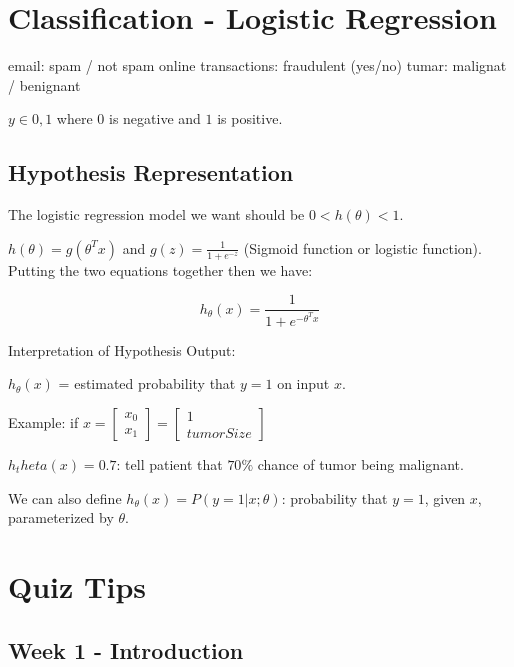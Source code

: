 \documentclass[a4paper]{article}
\begin{document}
\section{Classification - Logistic Regression}

email: spam / not spam
online transactions: fraudulent (yes/no)
tumar: malignat / benignant

$y \in {0, 1}$ where $0$ is negative and $1$ is positive.

\subsection{Hypothesis Representation}

The logistic regression model we want should be $0 < h(\theta) < 1$.

$h(\theta) = g(\theta^T x)$ and $g(z) = \frac{1}{1 + e^{-z}}$ (Sigmoid function or logistic function). Putting the two equations together then we have:

\[h_\theta(x) = \frac{1}{1 + e^{-\theta^T x}}\]


Interpretation of Hypothesis Output:

$h_\theta(x)$ = estimated probability that $y = 1$ on input $x$.

Example: if $x = \left[ \begin{array}{c} x_0 \\ x_1 \end{array} \right] =
\left[ \begin{array}{c} 1 \\ tumorSize \end{array} \right]$

\newline

$h_theta(x) = 0.7$: tell patient that $70\%$ chance of tumor being malignant.

We can also define $h_\theta(x) = P(y=1 | x;\theta)$: probability that $y=1$, given $x$, parameterized by $\theta$.




\section{Quiz Tips}

\subsection{Week 1 - Introduction}
\end{document}
